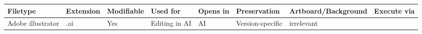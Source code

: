 \documentclass[]{article}
\begin{document}
\begin{longtable}[]{@{}llllllll@{}}
\toprule
\begin{minipage}[b]{0.16\columnwidth}\raggedright\strut
Filetype\strut
\end{minipage} & \begin{minipage}[b]{0.06\columnwidth}\raggedright\strut
Extension\strut
\end{minipage} & \begin{minipage}[b]{0.07\columnwidth}\raggedright\strut
Modifiable\strut
\end{minipage} & \begin{minipage}[b]{0.10\columnwidth}\raggedright\strut
Used for\strut
\end{minipage} & \begin{minipage}[b]{0.10\columnwidth}\raggedright\strut
Opens in\strut
\end{minipage} & \begin{minipage}[b]{0.10\columnwidth}\raggedright\strut
Preservation\strut
\end{minipage} & \begin{minipage}[b]{0.11\columnwidth}\raggedright\strut
Artboard/Background\strut
\end{minipage} & \begin{minipage}[b]{0.09\columnwidth}\raggedright\strut
Execute via\strut
\end{minipage}\tabularnewline
\midrule
\endhead
\begin{minipage}[t]{0.16\columnwidth}\raggedright\strut
Adobe illustrator\strut
\end{minipage} & \begin{minipage}[t]{0.06\columnwidth}\raggedright\strut
.ai\strut
\end{minipage} & \begin{minipage}[t]{0.07\columnwidth}\raggedright\strut
Yes\strut
\end{minipage} & \begin{minipage}[t]{0.10\columnwidth}\raggedright\strut
Editing in AI\strut
\end{minipage} & \begin{minipage}[t]{0.10\columnwidth}\raggedright\strut
AI\strut
\end{minipage} & \begin{minipage}[t]{0.10\columnwidth}\raggedright\strut
Version-specific\strut
\end{minipage} & \begin{minipage}[t]{0.11\columnwidth}\raggedright\strut
irrelevant\strut

\end{minipage}
\end{longtable}
\end{document}
